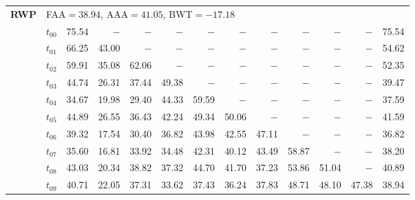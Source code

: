 \begin{table}[ht]
\begin{tabular}{@{}l l r r r r r r r r r r r@{}}
\midrule
\multirow{11}{*}{\textbf{RWP}} & \multicolumn{12}{l}{\quad\small FAA$=38.94$,\; AAA$=41.05$,\; BWT$=-17.18$} \\
 & $t_{00}$ & 75.54 & $-$ & $-$ & $-$ & $-$ & $-$ & $-$ & $-$ & $-$ & $-$ & 75.54 \\
 & $t_{01}$ & 66.25 & 43.00 & $-$ & $-$ & $-$ & $-$ & $-$ & $-$ & $-$ & $-$ & 54.62 \\
 & $t_{02}$ & 59.91 & 35.08 & 62.06 & $-$ & $-$ & $-$ & $-$ & $-$ & $-$ & $-$ & 52.35 \\
 & $t_{03}$ & 44.74 & 26.31 & 37.44 & 49.38 & $-$ & $-$ & $-$ & $-$ & $-$ & $-$ & 39.47 \\
 & $t_{04}$ & 34.67 & 19.98 & 29.40 & 44.33 & 59.59 & $-$ & $-$ & $-$ & $-$ & $-$ & 37.59 \\
 & $t_{05}$ & 44.89 & 26.55 & 36.43 & 42.24 & 49.34 & 50.06 & $-$ & $-$ & $-$ & $-$ & 41.59 \\
 & $t_{06}$ & 39.32 & 17.54 & 30.40 & 36.82 & 43.98 & 42.55 & 47.11 & $-$ & $-$ & $-$ & 36.82 \\
 & $t_{07}$ & 35.60 & 16.81 & 33.92 & 34.48 & 42.31 & 40.12 & 43.49 & 58.87 & $-$ & $-$ & 38.20 \\
 & $t_{08}$ & 43.03 & 20.34 & 38.82 & 37.32 & 44.70 & 41.70 & 37.23 & 53.86 & 51.04 & $-$ & 40.89 \\
 & $t_{09}$ & 40.71 & 22.05 & 37.31 & 33.62 & 37.43 & 36.24 & 37.83 & 48.71 & 48.10 & 47.38 & 38.94 \\
\bottomrule
\end{tabular}
\end{table}

